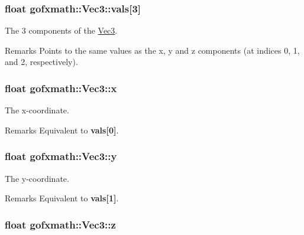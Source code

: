 \subsubsection[{vals}]{\setlength{\rightskip}{0pt plus 5cm}float gofxmath\+::\+Vec3\+::vals\mbox{[}3\mbox{]}}\label{classgofxmath_1_1_vec3_a3971d9f465d93491b33f68a9460721a5}


The 3 components of the \hyperlink{classgofxmath_1_1_vec3}{Vec3}. 

\begin{DoxyRemark}{Remarks}
Points to the same values as the x, y and z components (at indices 0, 1, and 2, respectively). 
\end{DoxyRemark}
\hypertarget{classgofxmath_1_1_vec3_a507868ff65b4e42f80da14bf355ee10a}{}
\subsubsection[{x}]{\setlength{\rightskip}{0pt plus 5cm}float gofxmath\+::\+Vec3\+::x}\label{classgofxmath_1_1_vec3_a507868ff65b4e42f80da14bf355ee10a}


The x-\/coordinate. 

\begin{DoxyRemark}{Remarks}
Equivalent to {\bfseries vals\mbox{[}0\mbox{]}}. 
\end{DoxyRemark}
\hypertarget{classgofxmath_1_1_vec3_afd348ae9f3c31f6215e91d8b5adcea5f}{}
\subsubsection[{y}]{\setlength{\rightskip}{0pt plus 5cm}float gofxmath\+::\+Vec3\+::y}\label{classgofxmath_1_1_vec3_afd348ae9f3c31f6215e91d8b5adcea5f}


The y-\/coordinate. 

\begin{DoxyRemark}{Remarks}
Equivalent to {\bfseries vals\mbox{[}1\mbox{]}}. 
\end{DoxyRemark}
\hypertarget{classgofxmath_1_1_vec3_a201779cb941bb4a6478ff13c897494ba}{}
\subsubsection[{z}]{\setlength{\rightskip}{0pt plus 5cm}float gofxmath\+::\+Vec3\+::z}\label{classgofxmath_1_1_vec3_a201779cb941bb4a6478ff13c897494ba}


